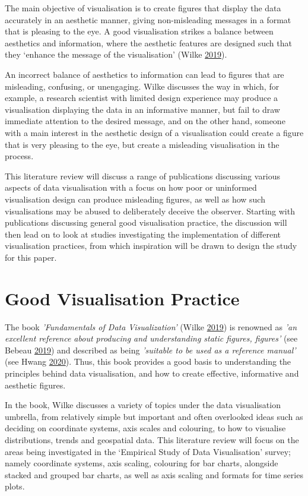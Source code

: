 \documentclass[
  11pt,
]{book}
\begin{document}
The main objective of visualisation is to create figures that display
the data accurately in an aesthetic manner, giving non-misleading
messages in a format that is pleasing to the eye. A good visualisation
strikes a balance between aesthetics and information, where the
aesthetic features are designed such that they `enhance the message of
the visualisation' (Wilke \protect\hyperlink{ref-wilke2019}{2019}).

An incorrect balance of aesthetics to information can lead to figures
that are misleading, confusing, or unengaging. Wilke discusses the way
in which, for example, a research scientist with limited design
experience may produce a visualisation displaying the data in an
informative manner, but fail to draw immediate attention to the desired
message, and on the other hand, someone with a main interest in the
aesthetic design of a visualisation could create a figure that is very
pleasing to the eye, but create a misleading visualisation in the
process.

This literature review will discuss a range of publications discussing
various aspects of data visualisation with a focus on how poor or
uninformed visualisation design can produce misleading figures, as well
as how such visualisations may be abused to deliberately deceive the
observer. Starting with publications discussing general good
visualisation practice, the discussion will then lead on to look at
studies investigating the implementation of different visualisation
practices, from which inspiration will be drawn to design the study for
this paper.

\section{Good Visualisation Practice}

The book \textit{'Fundamentals of Data Visualization'} (Wilke
\protect\hyperlink{ref-wilke2019}{2019}) is renowned as
\textit{'an excellent reference about producing and understanding static figures, figures'}
(see Bebeau \protect\hyperlink{ref-wilkerev}{2019}) and described as
being \textit{'suitable to be used as a reference manual'} (see Hwang
\protect\hyperlink{ref-hwang2020}{2020}). Thus, this book provides a
good basis to understanding the principles behind data visualisation,
and how to create effective, informative and aesthetic figures.

In the book, Wilke discusses a variety of topics under the data
visualisation umbrella, from relatively simple but important and often
overlooked ideas such as deciding on coordinate systems, axis scales and
colouring, to how to visualise distributions, trends and geospatial
data. This literature review will focus on the areas being investigated
in the `Empirical Study of Data Visualisation' survey; namely coordinate
systems, axis scaling, colouring for bar charts, alongside stacked and
grouped bar charts, as well as axis scaling and formats for time series
plots.
\end{document}
